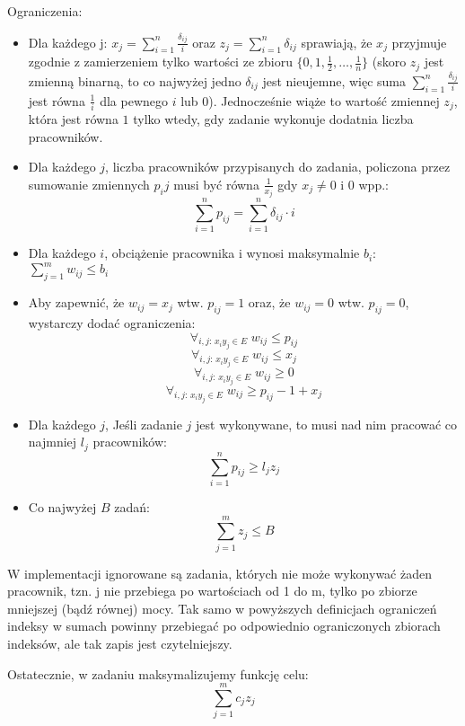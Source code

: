 \documentclass{article}
\begin{document}
Ograniczenia:
\begin{itemize}
    \item Dla każdego j:
    $x_j = \sum_{i=1}^n \frac{\delta_{ij}}{i}$ oraz $z_j = \sum_{i=1}^n \delta_{ij}$ sprawiają, że $x_j$ przyjmuje zgodnie z zamierzeniem tylko wartości ze zbioru $\{0, 1, \frac{1}{2}, \ldots, \frac{1}{n} \}$ (skoro $z_j$ jest zmienną binarną, to co najwyżej jedno $\delta_{ij}$ jest nieujemne, więc suma $\sum_{i=1}^n \frac{\delta_{ij}}{i}$ jest równa $\frac{1}{i}$ dla pewnego $i$ lub $0$). Jednocześnie wiąże to wartość zmiennej $z_j$, która jest równa $1$ tylko wtedy, gdy zadanie wykonuje dodatnia liczba pracowników.
    \item Dla każdego $j$, liczba pracowników przypisanych do zadania, policzona przez sumowanie zmiennych $p_ij$ musi być równa $\frac{1}{x_j}$ gdy $x_j \neq 0$ i $0$ wpp.:
    $$\sum_{i=1}^n p_{ij} = \sum_{i=1}^n \delta_{ij}\cdot i$$
    \item Dla każdego $i$, obciążenie pracownika i wynosi maksymalnie $b_i$: $\sum_{j=1}^m w_{ij} \leq b_i$
    \item Aby zapewnić, że $w_{ij} = x_j$ wtw. $p_{ij} = 1$ oraz, że $w_{ij} = 0$ wtw. $p_{ij} = 0$, wystarczy dodać ograniczenia:
    $$\forall_{i,j:\, x_iy_j \in E} \; w_{ij} \leq p_{ij}$$
    $$\forall_{i,j:\, x_iy_j \in E} \; w_{ij} \leq x_{j}$$
    $$\forall_{i,j:\, x_iy_j \in E} \; w_{ij} \geq 0$$
    $$\forall_{i,j:\, x_iy_j \in E} \; w_{ij} \geq p_{ij} - 1 + x_j$$
    \item Dla każdego $j$, Jeśli zadanie $j$ jest wykonywane, to musi nad nim pracować co najmniej $l_j$ pracowników: $$\sum_{i=1}^n p_{ij} \geq l_j z_j$$
    \item Co najwyżej $B$ zadań: $$\sum_{j=1}^m z_j \leq B$$
\end{itemize}

W implementacji ignorowane są zadania, których nie może wykonywać żaden pracownik, tzn. j nie przebiega po wartościach od 1 do m, tylko po zbiorze mniejszej (bądź równej) mocy. Tak samo w powyższych definicjach ograniczeń indeksy w sumach powinny przebiegać po odpowiednio ograniczonych zbiorach indeksów, ale tak zapis jest czytelniejszy.


Ostatecznie, w zadaniu maksymalizujemy funkcję celu:
$$\sum_{j=1}^m c_j z_j$$
\end{document}

